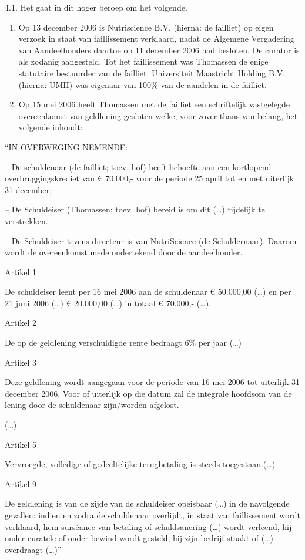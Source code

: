 \documentclass[
  dutch,
  a4paper,
]{article}
\begin{document}
4.1. Het gaat in dit hoger beroep om het volgende.

\begin{enumerate}
\def\labelenumi{\alph{enumi}.}
\item
  Op 13 december 2006 is Nutriscience B.V. (hierna: de failliet) op eigen verzoek in staat van faillissement verklaard, nadat de Algemene Vergadering van Aandeelhouders daartoe op 11 december 2006 had besloten. De curator is als zodanig aangesteld. Tot het faillissement was Thomassen de enige statutaire bestuurder van de failliet. Universiteit Maastricht Holding B.V. (hierna: UMH) was eigenaar van 100\% van de aandelen in de failliet.
\item
  Op 15 mei 2006 heeft Thomassen met de failliet een schriftelijk vastgelegde overeenkomst van geldlening gesloten welke, voor zover thans van belang, het volgende inhoudt:
\end{enumerate}

``IN OVERWEGING NEMENDE:

-- De schuldenaar (de failliet; toev. hof) heeft behoefte aan een kortlopend overbruggingskrediet van € 70.000,- voor de periode 25 april tot en met uiterlijk 31 december;

-- De Schuldeiser (Thomassen; toev. hof) bereid is om dit (\ldots) tijdelijk te verstrekken.

-- De Schuldeiser tevens directeur is van NutriScience (de Schuldernaar). Daarom wordt de overeenkomst mede ondertekend door de aandeelhouder.

Artikel 1

De schuldeiser leent per 16 mei 2006 aan de schuldenaar € 50.000,00 (\ldots) en per 21 juni 2006 (\ldots) € 20.000,00 (\ldots) in totaal € 70.000,- (\ldots).

Artikel 2

De op de geldlening verschuldigde rente bedraagt 6\% per jaar (\ldots)

Artikel 3

Deze geldlening wordt aangegaan voor de periode van 16 mei 2006 tot uiterlijk 31 december 2006. Voor of uiterlijk op die datum zal de integrale hoofdsom van de lening door de schuldenaar zijn/worden afgelost.

(\ldots)

Artikel 5

Vervroegde, volledige of gedeeltelijke terugbetaling is steeds toegestaan.(\ldots)

Artikel 9

De geldlening is van de zijde van de schuldeiser opeisbaar (\ldots) in de navolgende gevallen: indien en zodra de schuldenaar overlijdt, in staat van faillissement wordt verklaard, hem surséance van betaling of schuldsanering (\ldots) wordt verleend, hij onder curatele of onder bewind wordt gesteld, hij zijn bedrijf staakt of (\ldots) overdraagt (\ldots)''
\end{document}
